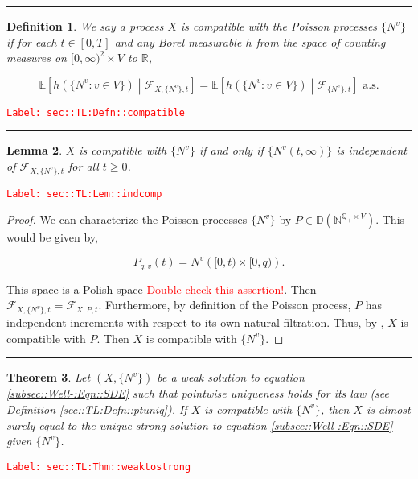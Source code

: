 \documentclass[12pt]{article}
\newcommand{\mb}{\mathbb}
\newcommand{\mc}{\mathcal}
\newcommand{\te}{\text}
\newcommand{\tr}{\textcolor{red}}
\newcommand{\labe}[1]{\tr{\texttt{Label: #1}}}
\newcommand{\lin}{\rule{\linewidth}{0.4 pt}}
\newcommand{\ex}[1]{\mb{E}\left[#1\right]}			%
\newcommand{\cad}{\mb{D}}							%
\renewcommand{\v}{v}							%
\renewcommand{\t}{t}							%
\newcommand{\F}{\mc{F}}							%
\newcommand{\X}{X}								%
\newcommand{\vind}[1]{^{#1}}					%
\newcommand{\cind}[1]{_{#1}}					%
\newcommand{\tp}[1]{(#1)}						%
\newcommand{\ts}[1]{_{#1}}						%
\newcommand{\poiss}{N}							%
\newcommand{\pra}[1]{_{#1}}						%
\newcommand{\rp}{P}								%
\newcommand{\prats}[2]{_{#1,#2}}				%
\newtheorem{thms}{Theorem}[section]
\newtheorem{lem}[thms]{Lemma}
\newtheorem{defn}[thms]{Definition}
\begin{document}
\lin

\begin{defn}
We say a process \(\X\) is compatible with the Poisson processes \(\{\poiss\vind{\v}\}\) if for each \(\t\in [0,T]\) and any Borel measurable \(h\) from the space of counting measures on \([0,\infty)^2\times V\) to \(\mb{R}\),

\[\ex{h(\{\poiss\vind{\v}:\v\in V\})\middle|\F\prats{\X,\{\poiss\vind{\v}\}}{\t}} = \ex{h(\{\poiss\vind{\v}:\v\in V\})\middle|\F\prats{\{\poiss\vind{\v}\}}{\t}} \te{ a.s.}\]
\label{sec::TL:Defn::compatible}
\end{defn}
\labe{sec::TL:Defn::compatible}

\lin

\begin{lem}
\(\X\) is compatible with \(\{\poiss\vind{\v}\}\) if and only if \(\{\poiss\vind{\v}(\t,\infty)\}\) is independent of \(\F\prats{\X,\{\poiss\vind{\v}\}}{\t}\) for all \(\t \geq 0\).
\label{sec::TL:Lem::indcomp}
\end{lem}
\labe{sec::TL:Lem::indcomp}

\begin{proof}
We can characterize the Poisson processes \(\{\poiss\vind{\v}\}\) by \(\rp \in \cad(\mb{N}^{\mb{Q}_+\times V})\). This would be given by,

\[\rp\cind{q,v}\tp{\t} = \poiss\vind{\v}\left([0,\t)\times [0,q)\right).\]

This space is a Polish space \tr{Double check this assertion!}. Then \(\F\prats{\X,\{\poiss\vind{\v}\}}{\t} = \F\prats{\X,\rp}{\t}\). Furthermore, by definition of the Poisson process, \(\rp\) has independent increments with respect to its own natural filtration. Thus, by \cite[Lemma 3.2]{Kur07}, \(\X\) is compatible with \(\rp\). Then \(\X\) is compatible with \(\{\poiss\vind{\v}\}\).
\end{proof}

\lin

\begin{thms}
Let \((\X,\{\poiss\vind{\v}\})\) be a weak solution to equation \eqref{subsec::Well-:Eqn::SDE} such that pointwise uniqueness holds for its law (see Definition \ref{sec::TL:Defn::ptuniq}). If \(\X\) is compatible with \(\{\poiss\vind{\v}\}\), then \(X\) is almost surely equal to the unique strong solution to equation \eqref{subsec::Well-:Eqn::SDE} given \(\{\poiss\vind{\v}\}\).
\label{sec::TL:Thm::weaktostrong}
\end{thms}
\labe{sec::TL:Thm::weaktostrong}

\newpage


\end{document}

